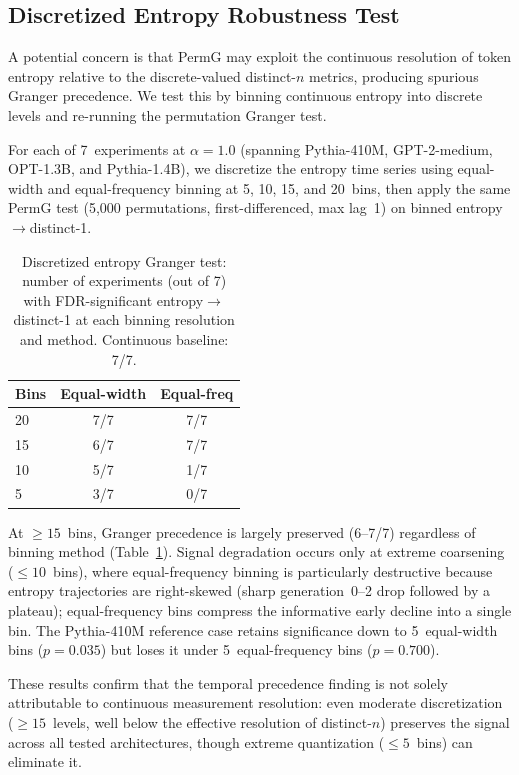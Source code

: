 \subsection{Discretized Entropy Robustness Test}
\label{app:discretized_entropy}

A potential concern is that PermG may exploit the continuous resolution of token entropy relative to the discrete-valued distinct-$n$ metrics, producing spurious Granger precedence.
We test this by binning continuous entropy into discrete levels and re-running the permutation Granger test.

For each of 7~experiments at $\alpha{=}1.0$ (spanning Pythia-410M, GPT-2-medium, OPT-1.3B, and Pythia-1.4B), we discretize the entropy time series using equal-width and equal-frequency binning at 5, 10, 15, and 20~bins, then apply the same PermG test (5{,}000 permutations, first-differenced, max lag~1) on binned entropy$\to$distinct-1.

\begin{table}[H]
\centering
\small
\caption{Discretized entropy Granger test: number of experiments (out of 7) with FDR-significant entropy$\to$distinct-1 at each binning resolution and method. Continuous baseline: 7/7.}
\label{tab:discretized_entropy}
\begin{tabular}{@{}lcc@{}}
\toprule
Bins & Equal-width & Equal-freq \\
\midrule
20 & 7/7 & 7/7 \\
15 & 6/7 & 7/7 \\
10 & 5/7 & 1/7 \\
5  & 3/7 & 0/7 \\
\bottomrule
\end{tabular}
\end{table}

At ${\geq}15$~bins, Granger precedence is largely preserved (6--7/7) regardless of binning method (Table~\ref{tab:discretized_entropy}).
Signal degradation occurs only at extreme coarsening (${\leq}10$~bins), where equal-frequency binning is particularly destructive because entropy trajectories are right-skewed (sharp generation~0--2 drop followed by a plateau); equal-frequency bins compress the informative early decline into a single bin.
The Pythia-410M reference case retains significance down to 5~equal-width bins ($p{=}0.035$) but loses it under 5~equal-frequency bins ($p{=}0.700$).

These results confirm that the temporal precedence finding is not solely attributable to continuous measurement resolution: even moderate discretization (${\geq}15$~levels, well below the effective resolution of distinct-$n$) preserves the signal across all tested architectures, though extreme quantization (${\leq}5$~bins) can eliminate it.



